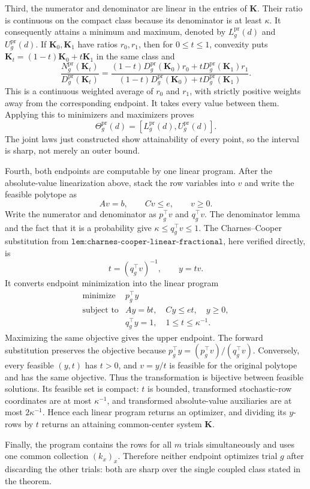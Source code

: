Third, the numerator and denominator are linear in the entries of \(\mathbf K\).  Their ratio is continuous on the compact class because its denominator is at least \(\kappa\).  It consequently attains a minimum and maximum, denoted by \(L_g^{\mathrm{pr}}(d)\) and \(U_g^{\mathrm{pr}}(d)\).  If \(\mathbf K_0,\mathbf K_1\) have ratios \(r_0,r_1\), then for \(0\le t\le1\), convexity puts \(\mathbf K_t=(1-t)\mathbf K_0+t\mathbf K_1\) in the same class and
\[
 \frac{N_g^{\mathrm{pr}}(\mathbf K_t)}{D_g^{\mathrm{pr}}(\mathbf K_t)}
 =\frac{(1-t)D_g^{\mathrm{pr}}(\mathbf K_0)r_0+tD_g^{\mathrm{pr}}(\mathbf K_1)r_1}
 {(1-t)D_g^{\mathrm{pr}}(\mathbf K_0)+tD_g^{\mathrm{pr}}(\mathbf K_1)}.
\]
This is a continuous weighted average of \(r_0\) and \(r_1\), with strictly positive weights away from the corresponding endpoint.  It takes every value between them.  Applying this to minimizers and maximizers proves
\[
 \Theta_g^{\mathrm{pr}}(d)=[L_g^{\mathrm{pr}}(d),U_g^{\mathrm{pr}}(d)].
\]
The joint laws just constructed show attainability of every point, so the interval is sharp, not merely an outer bound.

Fourth, both endpoints are computable by one linear program.  After the absolute-value linearization above, stack the row variables into \(v\) and write the feasible polytope as
\[
 Av=b,\qquad Cv\le e,\qquad v\ge0.
\]
Write the numerator and denominator as \(p_g^{\top}v\) and \(q_g^{\top}v\).  The denominator lemma and the fact that it is a probability give
\(\kappa\le q_g^{\top}v\le1\).  The Charnes--Cooper substitution from \(\texttt{lem:charnes-cooper-linear-fractional}\), here verified directly, is
\[
 t=(q_g^{\top}v)^{-1},\qquad y=tv.
\]
It converts endpoint minimization into the linear program
\[
 \begin{array}{ll}
 \text{minimize}&p_g^{\top}y\\
 \text{subject to}&Ay=bt,\quad Cy\le et,\quad y\ge0,\\
 &q_g^{\top}y=1,\quad 1\le t\le\kappa^{-1}.
 \end{array}
\]
Maximizing the same objective gives the upper endpoint.  The forward substitution preserves the objective because \(p_g^{\top}y=(p_g^{\top}v)/(q_g^{\top}v)\).  Conversely, every feasible \((y,t)\) has \(t>0\), and \(v=y/t\) is feasible for the original polytope and has the same objective.  Thus the transformation is bijective between feasible solutions.  Its feasible set is compact: \(t\) is bounded, transformed stochastic-row coordinates are at most \(\kappa^{-1}\), and transformed absolute-value auxiliaries are at most \(2\kappa^{-1}\).  Hence each linear program returns an optimizer, and dividing its \(y\)-rows by \(t\) returns an attaining common-center system \(\mathbf K\).

Finally, the program contains the rows for all \(m\) trials simultaneously and uses one common collection \((k_x)_x\).  Therefore neither endpoint optimizes trial \(g\) after discarding the other trials: both are sharp over the single coupled class stated in the theorem.